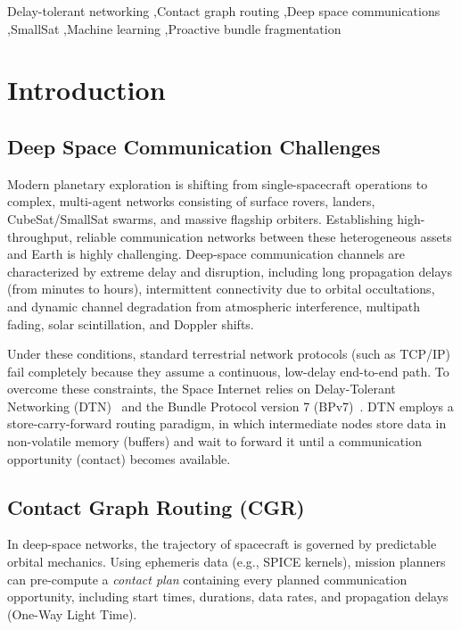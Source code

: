 \documentclass[a4paper,fleqn]{cas-dc}
\begin{document}
\begin{keywords}
Delay-tolerant networking \sep Contact graph routing \sep Deep space communications \sep SmallSat \sep Machine learning \sep Proactive bundle fragmentation
\end{keywords}

\maketitle

\section{Introduction}
\label{sec:intro}

\subsection{Deep Space Communication Challenges}
Modern planetary exploration is shifting from single-spacecraft operations to complex, multi-agent networks consisting of surface rovers, landers, CubeSat/SmallSat swarms, and massive flagship orbiters. Establishing high-throughput, reliable communication networks between these heterogeneous assets and Earth is highly challenging. Deep-space communication channels are characterized by extreme delay and disruption, including long propagation delays (from minutes to hours), intermittent connectivity due to orbital occultations, and dynamic channel degradation from atmospheric interference, multipath fading, solar scintillation, and Doppler shifts.

Under these conditions, standard terrestrial network protocols (such as TCP/IP) fail completely because they assume a continuous, low-delay end-to-end path. To overcome these constraints, the Space Internet relies on Delay-Tolerant Networking (DTN)~\cite{fall2003dtn,cerf2007dtn} and the Bundle Protocol version 7 (BPv7)~\cite{rfc9171}. DTN employs a store-carry-forward routing paradigm, in which intermediate nodes store data in non-volatile memory (buffers) and wait to forward it until a communication opportunity (contact) becomes available.

\subsection{Contact Graph Routing (CGR)}
In deep-space networks, the trajectory of spacecraft is governed by predictable orbital mechanics. Using ephemeris data (e.g., SPICE kernels), mission planners can pre-compute a \emph{contact plan} containing every planned communication opportunity, including start times, durations, data rates, and propagation delays (One-Way Light Time).
\end{document}
